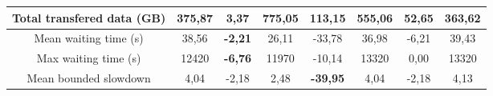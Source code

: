 \begin{table}[]
\begin{tabular}{cccccccc}
\multicolumn{1}{|c|}{Total transfered data (GB)} & \multicolumn{1}{c|}{375,87}         & \multicolumn{1}{c|}{\textbf{3,37}}   & \multicolumn{1}{c|}{775,05}         & \multicolumn{1}{c|}{113,15}          & \multicolumn{1}{c|}{555,06}         & \multicolumn{1}{c|}{52,65}         & \multicolumn{1}{c|}{363,62}            \\ \hline
\multicolumn{1}{|c|}{Mean waiting time (s)}      & \multicolumn{1}{c|}{38,56}          & \multicolumn{1}{c|}{\textbf{-2,21}}  & \multicolumn{1}{c|}{26,11}          & \multicolumn{1}{c|}{-33,78}          & \multicolumn{1}{c|}{36,98}          & \multicolumn{1}{c|}{-6,21}         & \multicolumn{1}{c|}{39,43}             \\ \hline
\multicolumn{1}{|c|}{Max waiting time (s)}       & \multicolumn{1}{c|}{12420}          & \multicolumn{1}{c|}{\textbf{-6,76}}  & \multicolumn{1}{c|}{11970}          & \multicolumn{1}{c|}{-10,14}          & \multicolumn{1}{c|}{13320}          & \multicolumn{1}{c|}{0,00}          & \multicolumn{1}{c|}{13320}             \\ \hline
\multicolumn{1}{|c|}{Mean bounded slowdown}      & \multicolumn{1}{c|}{4,04}           & \multicolumn{1}{c|}{-2,18}           & \multicolumn{1}{c|}{2,48}           & \multicolumn{1}{c|}{\textbf{-39,95}} & \multicolumn{1}{c|}{4,04}           & \multicolumn{1}{c|}{-2,18}         & \multicolumn{1}{c|}{4,13}              \\ \hline
\end{tabular}
\end{table}



